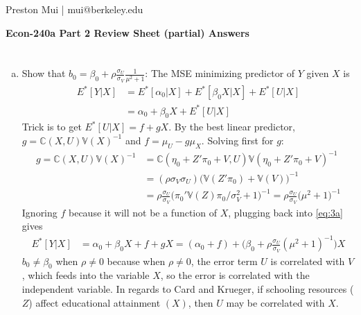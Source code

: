 \documentclass{article}[12pt]
\begin{document}
\begin{center}
	Preston Mui | mui@berkeley.edu

	{\bf Econ-240a Part 2 Review Sheet (partial) Answers}
\end{center}

\setcounter{section}{2}

\section{}
\begin{enumerate}[(a)]
	\item Show that $b_0 = \beta_0 + \rho \frac{\sigma_U}{\sigma_V} \frac{1}{\mu^2 + 1}$: The MSE minimizing predictor of $Y$ given $X$ is
	\begin{align}
		E^*[Y | X] &= E^*[\alpha_0 | X ] + E^*[\beta_0 X | X] + E^*[U | X] \nonumber \\
		&= \alpha_0 + \beta_0 X + E^*[U | X] \label{eq:3a}
	\end{align}
	Trick is to get $E^*[U | X] = f + gX$. By the best linear predictor, $g = \mathbb{C}(X,U) \mathbb{V}(X)^{-1}$ and $f = \mu_U - g \mu_X$. Solving first for $g$:
	\begin{align*}
		g = \mathbb{C}(X,U) \mathbb{V}(X)^{-1} &= \mathbb{C}(\eta_0 + Z' \pi_0 + V,U) \mathbb{V}(\eta_0 + Z'\pi_0 + V)^{-1} \\
		&= (\rho \sigma_V \sigma_U) \Big(\mathbb{V}(Z'\pi_0) + \mathbb{V}(V) \Big)^{-1} \\
		&= \rho \frac{\sigma_U}{\sigma_V}\Big( \pi_0' \mathbb{V}(Z) \pi_0/ \sigma_V^2 + 1 \Big)^{-1} = \rho \frac{\sigma_U}{\sigma_V}\Big( \mu^2 + 1 \Big)^{-1}
	\end{align*}
	Ignoring $f$ because it will not be a function of $X$, plugging back into \eqref{eq:3a} gives
	\begin{align*}
		E^*[Y | X] &= \alpha_0 + \beta_0 X + f + gX = (\alpha_0 + f) + \Big(\beta_0 + \rho \frac{\sigma_U}{\sigma_V}( \mu^2 + 1 )^{-1}\Big) X
	\end{align*}
	$b_0 \neq \beta_0$ when $\rho \neq 0$ because when $\rho \neq 0$, the error term $U$ is correlated with $V$, which feeds into the variable $X$, so the error is correlated with the independent variable. In regards to Card and Krueger, if schooling resources ($Z$) affect educational attainment $(X)$, then $U$ may be correlated with $X$.
	

\end{enumerate}
\end{document}
